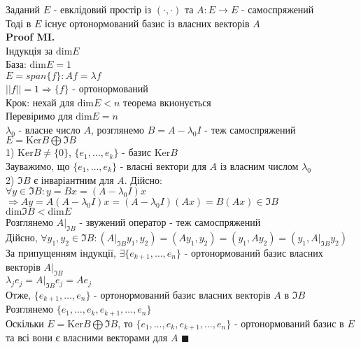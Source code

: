 \documentclass[a4paper, 14pt]{extarticle}
\def\proofMI{\textbf{Proof MI.}\\}
\def\bigline{\vspace{5mm}\\}
\def\qed{$\blacksquare$}
\def\dim#1{\textrm{dim} {#1}}
\def\ker#1{\textrm{Ker} {#1}}
\begin{document}
Заданий $E$ - евклідовий простір із $(\cdot, \cdot)$ та $A: E \to E$ - самоспряжений\\
Тоді в $E$ існує ортонормований базис із власних векторів $A$\\
\proofMI
Індукція за $\dim E$\\
База: $\dim E = 1$\\
$E = span\{f\}: Af = \lambda f$\\
$||f|| = 1 \Rightarrow \{f\}$ - ортонормований
\bigline
Крок: нехай для $\dim E < n$ теорема вкионується\\
Перевіримо для $\dim E = n$\\
$\lambda_0$ - власне число $A$, розглянемо $B = A - \lambda_0 I$ - теж самоспряжений\\
$E = \ker B \bigoplus \Im B$\\
1) $\ker B \neq \{0\}$, $\{e_1,\dots,e_k\}$ - базис $\ker B$\\
Зауважимо, що $\{e_1,\dots,e_k\}$ - власні вектори для $A$ із власним числом $\lambda_0$\\
2) $\Im B$ є інваріантним для $A$. Дійсно:\\
$\forall y \in \Im B: y = Bx = (A-\lambda_0 I)x$\\
$\Rightarrow Ay = A(A-\lambda_0 I)x = (A-\lambda_0 I)(Ax) = B(Ax) \in \Im B$\\
$\dim \Im B < \dim E$\\
Розглянемо  $A|_{\Im B}$ - звужений оператор - теж самоспряжений\\
Дійсно, $\forall y_1,y_2 \in \Im B: (A|_{\Im B} y_1, y_2) = (Ay_1, y_2) = (y_1, Ay_2) = (y_1, A|_{\Im B} y_2)$\\
За припущенням індукції, $\exists \{e_{k+1},\dots,e_n\}$ - ортонормований базис власних векторів $A|_{\Im B}$\\
$\lambda_j e_j = A|_{\Im B} e_j = Ae_j$\\
Отже, $\{e_{k+1},\dots,e_n\}$ - ортонормований базис власних векторів $A$ в $\Im B$\\
Розглянемо $\{e_1,\dots,e_k,e_{k+1},\dots,e_n\}$\\
Оскільки $E = \ker B \bigoplus \Im B$, то $\{e_1,\dots,e_k,e_{k+1},\dots,e_n\}$ - ортонормований базис в $E$ та всі вони є власними векторами для $A$ \qed
\bigline
\end{document}

